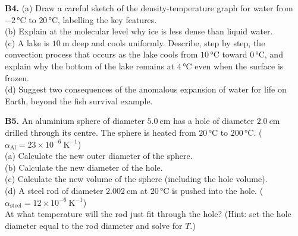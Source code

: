\begin{exercisebox}[13]
\vspace{0.4cm}

\textbf{B4.} (a) Draw a careful sketch of the
density-temperature graph for water from
$-2\,°\text{C}$ to $20\,°\text{C}$, labelling the
key features.\\[4pt]
(b) Explain at the molecular level why ice is less
dense than liquid water.\\
(c) A lake is $10\ \text{m}$ deep and cools uniformly.
Describe, step by step, the convection process that
occurs as the lake cools from $10\,°\text{C}$ toward
$0\,°\text{C}$, and explain why the bottom of the
lake remains at $4\,°\text{C}$ even when the surface
is frozen.\\
(d) Suggest two consequences of the anomalous
expansion of water for life on Earth, beyond the
fish survival example.
\hfill{}

\vspace{0.4cm}

\textbf{B5.} An aluminium sphere of diameter
$5.0\ \text{cm}$ has a hole of diameter
$2.0\ \text{cm}$ drilled through its centre. The
sphere is heated from $20\,°\text{C}$ to $200\,°\text{C}$.
($\alpha_{\text{Al}} = 23\times10^{-6}\ \text{K}^{-1}$)\\[4pt]
(a) Calculate the new outer diameter of the sphere.\\
(b) Calculate the new diameter of the hole.\\
(c) Calculate the new volume of the sphere
(including the hole volume).\\
(d) A steel rod of diameter $2.002\ \text{cm}$ at
$20\,°\text{C}$ is pushed into the hole.
($\alpha_{\text{steel}} = 12\times10^{-6}\ \text{K}^{-1}$)\\
At what temperature will the rod just fit through
the hole? (Hint: set the hole diameter equal to the
rod diameter and solve for $T$.)
\hfill{}

\end{exercisebox}

